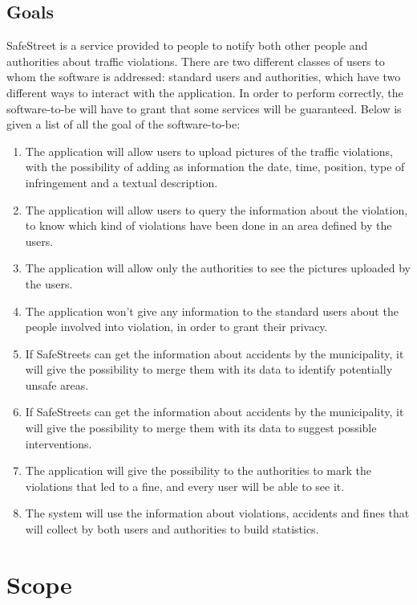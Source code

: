 \documentclass[a4paper, hidelinks, 12pt]{report}
\newcommand\goal[1]{\item[{[G#1]}] }
\begin{document}
	\subsection{Goals}\label{subsec:goals}
	SafeStreet is a service provided to people to notify both other people and authorities about traffic violations. There are two different classes of users to whom the software is addressed: standard users and authorities, which have two different ways to interact with the application.
	In order to perform correctly, the software-to-be will have to grant that some services will be guaranteed. Below is given a list of all the goal of the software-to-be:
	\begin{enumerate}
		\goal{1} The application will allow users to upload pictures of the traffic violations, with the possibility of adding as information the date, time, position, type of infringement and a textual description.
		\goal{2} The application will allow users to query the information about the violation, to know which kind of violations have been done in an area defined by the users.
		\goal{3} The application will allow only the authorities to see the pictures uploaded by the users.
		\goal{4} The application won’t give any information to the standard users about the people involved into violation, in order to grant their privacy.
		\goal{5} If SafeStreets can get the information about accidents by the municipality, it will give the possibility to merge them with its data to identify potentially unsafe areas.
		\goal{6} If SafeStreets can get the information about accidents by the municipality, it will give the possibility to merge them with its data to suggest possible interventions.
		\goal{7} The application will give the possibility to the authorities to mark the violations that led to a fine, and every user will be able to see it.
		\goal{8} The system will use the information about violations, accidents and fines that will collect by both users and authorities to build statistics.
	\end{enumerate}
	\section{Scope}\label{sec:scope}
\end{document}
